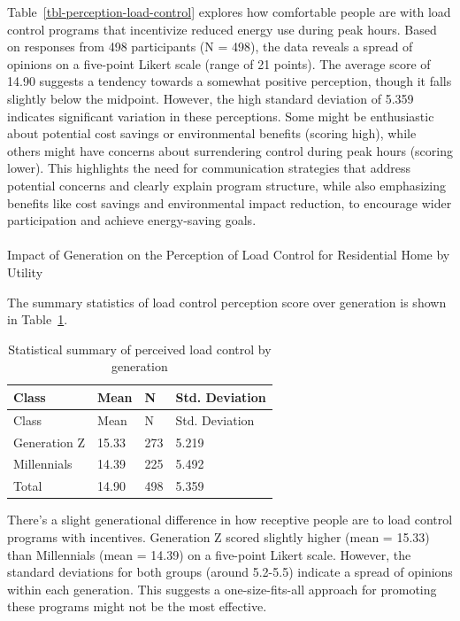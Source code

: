 \documentclass[
  letterpaper,
  DIV=11,
  numbers=noendperiod]{scrartcl}
\makeatletter
\let\oldparagraph\paragraph
\renewcommand{\paragraph}{
    \@ifstar
      \xxxParagraphStar
      \xxxParagraphNoStar
  }
\newcommand{\xxxParagraphStar}[1]{\oldparagraph*{#1}\mbox{}}
\newcommand{\xxxParagraphNoStar}[1]{\oldparagraph{#1}\mbox{}}
\makeatother
\begin{document}
Table~\ref{tbl-perception-load-control} explores how comfortable people
are with load control programs that incentivize reduced energy use
during peak hours. Based on responses from 498 participants (N = 498),
the data reveals a spread of opinions on a five-point Likert scale
(range of 21 points). The average score of 14.90 suggests a tendency
towards a somewhat positive perception, though it falls slightly below
the midpoint. However, the high standard deviation of 5.359 indicates
significant variation in these perceptions. Some might be enthusiastic
about potential cost savings or environmental benefits (scoring high),
while others might have concerns about surrendering control during peak
hours (scoring lower). This highlights the need for communication
strategies that address potential concerns and clearly explain program
structure, while also emphasizing benefits like cost savings and
environmental impact reduction, to encourage wider participation and
achieve energy-saving goals.

\paragraph{Impact of Generation on the Perception of Load Control for
Residential Home by
Utility}\label{impact-of-generation-on-the-perception-of-load-control-for-residential-home-by-utility}

The summary statistics of load control perception score over generation
is shown in Table~\ref{tbl-load-control-generation}.

\begin{longtable}[]{@{}llll@{}}
\caption{Statistical summary of perceived load control by
generation}\label{tbl-load-control-generation}\tabularnewline
\toprule\noalign{}
Class & Mean & N & Std. Deviation \\
\midrule\noalign{}
\endfirsthead
\toprule\noalign{}
Class & Mean & N & Std. Deviation \\
\midrule\noalign{}
\endhead
\bottomrule\noalign{}
\endlastfoot
Generation Z & 15.33 & 273 & 5.219 \\
Millennials & 14.39 & 225 & 5.492 \\
Total & 14.90 & 498 & 5.359 \\
\end{longtable}

There's a slight generational difference in how receptive people are to
load control programs with incentives. Generation Z scored slightly
higher (mean = 15.33) than Millennials (mean = 14.39) on a five-point
Likert scale. However, the standard deviations for both groups (around
5.2-5.5) indicate a spread of opinions within each generation. This
suggests a one-size-fits-all approach for promoting these programs might
not be the most effective.
\end{document}
